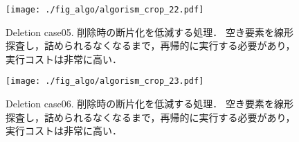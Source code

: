 \begin{figure}[h]
  \texttt{[image: ./fig\_algo/algorism\_crop\_22.pdf]}
  \caption{
    Deletion case05.
    削除時の断片化を低減する処理．
    空き要素を線形探査し，詰められるなくなるまで，再帰的に実行する必要があり，実行コストは非常に高い．
  }
  \label{fig_IpCHashT_deletion_case05}

  \texttt{[image: ./fig\_algo/algorism\_crop\_23.pdf]}
  \caption{
    Deletion case06.
    削除時の断片化を低減する処理．
    空き要素を線形探査し，詰められるなくなるまで，再帰的に実行する必要があり，実行コストは非常に高い．
  }
  \label{fig_IpCHashT_deletion_case06}
\end{figure}


